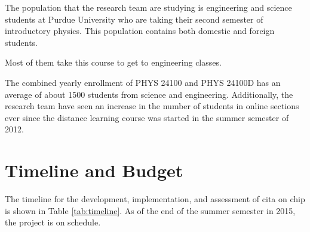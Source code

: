 The population that the research team are studying is engineering and science students at Purdue University who are taking their second semester of introductory physics. This population contains both domestic and foreign students.

Most of them take this course to get to engineering classes.

The combined yearly enrollment of PHYS 24100 and PHYS 24100D has an average of about 1500 students from science and engineering. Additionally, the research team have seen an increase in the number of students in online sections ever since the distance learning course was started in the summer semester of 2012.

\section{Timeline and Budget}

The timeline for the development, implementation, and assessment of \gls{cita} on \gls{chip} is shown in Table \ref{tab:timeline}. As of the end of the summer semester in 2015, the project is on schedule.

\pagebreak

